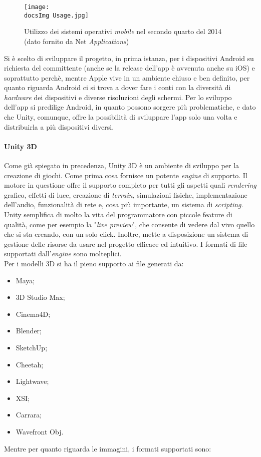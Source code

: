 \begin{figure}[H]
	\centering
	\texttt{[image: \\docsImg Usage.jpg]}
	\caption{Utilizzo dei sistemi operativi \textit{mobile} nel secondo quarto del 2014 (dato fornito da Net \textit{Applications})}
	\label{fig:Utilizzo dei sistemi operativi mobile nel secondo quarto del 2014}
\end{figure}
\noindent
Si \`e scelto di sviluppare il progetto, in prima istanza, per i dispositivi Android su richiesta del committente (anche se la release dell'app \`e avvenuta anche su iOS) e soprattutto perch\`e, mentre Apple vive in un ambiente chiuso e ben definito, per quanto riguarda Android ci si trova a dover fare i conti con la diversit\`a di \textit{hardware} dei dispositivi e diverse risoluzioni degli schermi. Per lo sviluppo dell'app si predilige Android, in quanto possono sorgere pi\`u problematiche, e dato che Unity, comunque, offre la possibilit\`a di sviluppare l'app solo una volta e distribuirla a pi\`u dispositivi diversi.


\paragraph{Unity 3D}
Come gi\`a spiegato in precedenza, Unity 3D è un ambiente di sviluppo per la creazione di giochi. Come prima cosa fornisce un potente \textit{engine} di supporto. Il motore in questione offre il supporto completo per tutti gli aspetti quali \textit{rendering} grafico, effetti di luce, creazione di \textit{terrain}, simulazioni fisiche, implementazione dell’audio, funzionalità di rete e, cosa pi\`u importante, un sistema di \textit{scripting}.
Unity semplifica di molto la vita del programmatore con piccole feature di qualit\`a, come per esempio la "\textit{live preview}", che consente di vedere dal vivo quello che si sta creando, con un solo click. Inoltre, mette a disposizione un sistema di gestione delle risorse da usare nel progetto efficace ed intuitivo.
I formati di file supportati dall'\textit{engine} sono molteplici. 
\\Per i modelli 3D si ha il pieno supporto ai file generati da:

\begin{multicols}{3}
\begin{itemize}
	\item Maya;
	\item 3D Studio Max;
	\item Cinema4D;
	\item Blender;
	\item SketchUp;
	\item Cheetah;
	\item Lightwave;
	\item XSI;
	\item Carrara;
	\item Wavefront Obj.
\end{itemize}
\end{multicols}
Mentre per quanto riguarda le immagini, i formati supportati sono:


